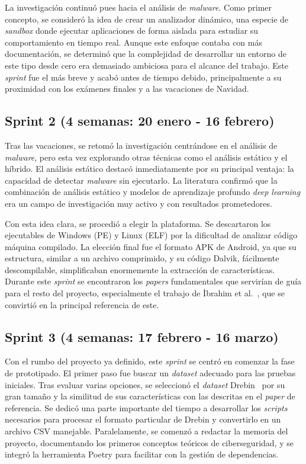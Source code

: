 La investigación continuó pues hacia el análisis de \textit{malware}. Como primer concepto, se consideró la idea de crear un analizador dinámico, una especie de \textit{sandbox} donde ejecutar aplicaciones de forma aislada para estudiar su comportamiento en tiempo real. Aunque este enfoque contaba con más documentación, se determinó que la complejidad de desarrollar un entorno de este tipo desde cero era demasiado ambiciosa para el alcance del trabajo. Este \textit{sprint} fue el más breve y acabó antes de tiempo debido, principalmente a su proximidad con los exámenes finales y a las vacaciones de Navidad.

\subsection{Sprint 2 (4 semanas: 20 enero - 16 febrero)}

Tras las vacaciones, se retomó la investigación centrándose en el análisis de \textit{malware}, pero esta vez explorando otras técnicas como el análisis estático y el híbrido. El análisis estático destacó inmediatamente por su principal ventaja: la capacidad de detectar \textit{malware} sin ejecutarlo. La literatura confirmó que la combinación de análisis estático y modelos de aprendizaje profundo \textit{deep learning} era un campo de investigación muy activo y con resultados prometedores.

Con esta idea clara, se procedió a elegir la plataforma. Se descartaron los ejecutables de Windows (PE) y Linux (ELF) por la dificultad de analizar código máquina compilado. La elección final fue el formato APK de Android, ya que su estructura, similar a un archivo comprimido, y su código Dalvik, fácilmente descompilable, simplificaban enormemente la extracción de características. Durante este \textit{sprint} se encontraron los \textit{papers} fundamentales que servirían de guía para el resto del proyecto, especialmente el trabajo de İbrahim et al.~\cite{9936621}, que se convirtió en la principal referencia de este.

\subsection{Sprint 3 (4 semanas: 17 febrero - 16 marzo)}

Con el rumbo del proyecto ya definido, este \textit{sprint} se centró en comenzar la fase de prototipado. El primer paso fue buscar un \textit{dataset} adecuado para las pruebas iniciales. Tras evaluar varias opciones, se seleccionó el \textit{dataset} Drebin~\cite{arp2014drebin} por su gran tamaño y la similitud de sus características con las descritas en el \textit{paper} de referencia. Se dedicó una parte importante del tiempo a desarrollar los \textit{scripts} necesarios para procesar el formato particular de Drebin y convertirlo en un archivo CSV manejable. Paralelamente, se comenzó a redactar la memoria del proyecto, documentando los primeros conceptos teóricos de ciberseguridad, y se integró la herramienta Poetry para facilitar con la gestión de dependencias.

